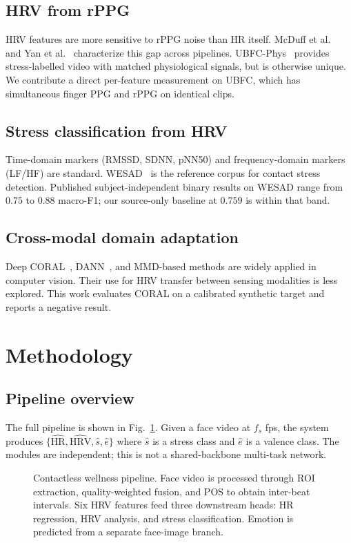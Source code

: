 \documentclass[conference]{IEEEtran}
\begin{document}
\subsection{HRV from rPPG}
HRV features are more sensitive to rPPG noise than HR itself. McDuff
et al.~\cite{mcduff2017} and Yan et al.~\cite{yan2019} characterize
this gap across pipelines. UBFC-Phys~\cite{meziati2021} provides
stress-labelled video with matched physiological signals, but is
otherwise unique. We contribute a direct per-feature measurement on
UBFC, which has simultaneous finger PPG and rPPG on identical clips.

\subsection{Stress classification from HRV}
Time-domain markers (RMSSD, SDNN, pNN50) and frequency-domain markers
(LF/HF) are standard. WESAD~\cite{schmidt2018} is the reference corpus
for contact stress detection. Published subject-independent binary
results on WESAD range from $0.75$ to $0.88$ macro-F1; our
source-only baseline at $0.759$ is within that band.

\subsection{Cross-modal domain adaptation}
Deep CORAL~\cite{sun2016}, DANN~\cite{ganin2016}, and MMD-based
methods are widely applied in computer vision. Their use for HRV
transfer between sensing modalities is less explored. This work
evaluates CORAL on a calibrated synthetic target and reports a
negative result.

\section{Methodology}

\subsection{Pipeline overview}
The full pipeline is shown in Fig.~\ref{fig:pipeline}. Given a face
video at $f_s$ fps, the system produces $\{\widehat{\mathrm{HR}},
\widehat{\mathrm{HRV}}, \hat{s}, \hat{e}\}$ where $\hat{s}$ is a
stress class and $\hat{e}$ is a valence class. The modules are
independent; this is not a shared-backbone multi-task network.

\begin{figure}[t]
\centering
\caption{Contactless wellness pipeline. Face video is processed
through ROI extraction, quality-weighted fusion, and POS to obtain
inter-beat intervals. Six HRV features feed three downstream heads:
HR regression, HRV analysis, and stress classification. Emotion is
predicted from a separate face-image branch.}
\label{fig:pipeline}
\end{figure}
\end{document}
